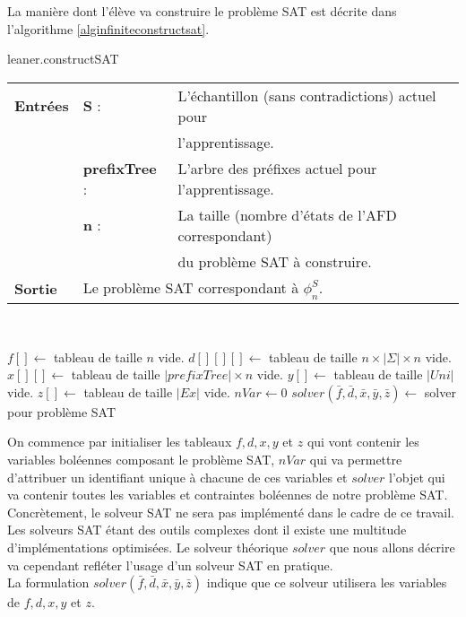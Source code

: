 \documentclass[12pt,a4paper,oneside,titlepage]{report}
\begin{document}
\noindent La manière dont l'élève va construire le problème SAT est décrite dans l'algorithme \ref{alginfiniteconstructsat}.

\begin{algorithm}[H]
\caption{leaner.constructSAT}\label{alginfiniteconstructsat}
\hspace*{\algorithmicindent} 
\begin{tabular}{lll}
	\textbf{Entrées} & \textbf{S} : &L'échantillon (sans contradictions) actuel pour\\
	&&l'apprentissage.\\
	&\textbf{prefixTree} : &L'arbre des préfixes actuel pour l'apprentissage.\\
	&\textbf{n} : &La taille (nombre d'états de l'AFD correspondant)\\
	&&du problème SAT à construire.\\
	\textbf{Sortie} &\multicolumn{2}{l}{Le problème SAT correspondant à $\phi_n^S$.}\\
\end{tabular}\\
\begin{algorithmic}[1]
\State $f[]\gets$ tableau de taille $n$ vide.
\State $d[][][]\gets$ tableau de taille $n\times |\Sigma|\times n$ vide.
\State $x[][]\gets$ tableau de taille $|prefixTree|\times n$ vide.
\State $y[]\gets$ tableau de taille $|Uni|$ vide.
\State $z[]\gets$ tableau de taille $|Ex|$ vide.
\State $nVar\gets 0$
\State $solver(\bar{f},\bar{d},\bar{x},\bar{y},\bar{z})\gets $ solver pour problème SAT
\end{algorithmic}
\end{algorithm}
\noindent On commence par initialiser les tableaux $f,d,x,y$ et $z$ qui vont contenir les variables boléennes composant le problème SAT, $nVar$ qui va permettre d'attribuer un identifiant unique à chacune de ces variables et $solver$ l'objet qui va contenir toutes les variables et contraintes boléennes de notre problème SAT.\\

Concrètement, le solveur SAT ne sera pas implémenté dans le cadre de ce travail. Les solveurs SAT étant des outils complexes dont il existe une multitude d'implémentations optimisées. Le solveur théorique $solver$ que nous allons décrire va cependant refléter l'usage d'un solveur SAT en pratique.\\

\noindent La formulation $solver(\bar{f},\bar{d},\bar{x},\bar{y},\bar{z})$ indique que ce solveur utilisera les variables de $f,d,x,y$ et $z$.\\
\end{document}
